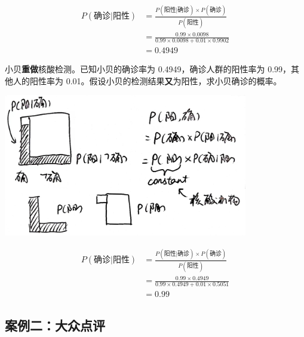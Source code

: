 \documentclass[UTF8]{ctexart}
\begin{document}
\begin{Answer}
	\begin{equation}
		\begin{aligned}
			P(\text{确诊}|\text{阳性})
			 & = \frac{P(\text{阳性}|\text{确诊}) \times P(\text{确诊})}{P(\text{阳性})}    \\
			 & = \frac{0.99 \times 0.0098}{0.99 \times 0.0098 + 0.01 \times 0.9902} \\
			 & = 0.4949
		\end{aligned}
	\end{equation}
\end{Answer}


\begin{Exercise}
	小贝\textbf{重做}核酸检测。已知小贝的确诊率为 0.4949，确诊人群的阳性率为 0.99，其他人的阳性率为 0.01。假设小贝的检测结果\textbf{又}为阳性，求小贝确诊的概率。
\end{Exercise}

\begin{center}
	\includegraphics[width=0.8\textwidth]{fig7.jpg}
\end{center}

\begin{Answer}
	\begin{equation}
		\begin{aligned}
			P(\text{确诊}|\text{阳性})
			 & = \frac{P(\text{阳性}|\text{确诊}) \times P(\text{确诊})}{P(\text{阳性})}    \\
			 & = \frac{0.99 \times 0.4949}{0.99 \times 0.4949 + 0.01 \times 0.5051} \\
			 & = 0.99
		\end{aligned}
	\end{equation}
\end{Answer}

\subsection{案例二：大众点评}
\end{document}
